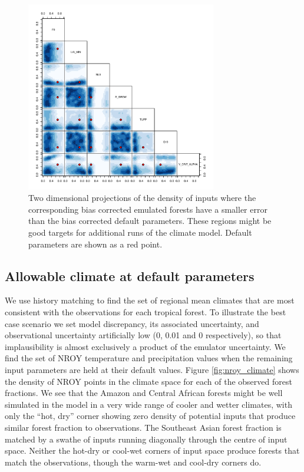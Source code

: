 \documentclass[gmd, manuscript]{copernicus}
\begin{document}
\begin{figure}[t]
\includegraphics[width=8.3cm]{../graphics/smaller_error_bc_default.pdf}
\caption{Two dimensional projections of the density of inputs where the corresponding bias corrected emulated forests have a smaller error than the bias corrected default parameters. These regions might be good targets for additional runs of the climate model. Default parameters are shown as a red point.
}
\label{fig:smaller_error_bc_default}
\end{figure}


\subsection{Allowable climate at default parameters}\label{ssec:allowable}
We use history matching to find the set of regional mean climates that are most consistent with the observations for each tropical forest. To illustrate the best case scenario we set model discrepancy, its associated uncertainty, and observational uncertainty artificially low (0, 0.01 and 0 respectively), so that implausibility is almost exclusively a product of the emulator uncertainty. We find the set of NROY temperature and precipitation values when the remaining input parameters are held at their default values. Figure \ref{fig:nroy_climate} shows the density of NROY points in the climate space for each of the observed forest fractions. We see that the Amazon and Central African forests might be well simulated in the model in a very wide range of cooler and wetter climates, with only the ``hot, dry'' corner showing zero density of potential inputs that produce similar forest fraction to observations. The Southeast Asian forest fraction is matched by a swathe of inputs running diagonally through the centre of input space. Neither the hot-dry or cool-wet corners of input space produce forests that match the observations, though the warm-wet and cool-dry corners do.
\end{document}
